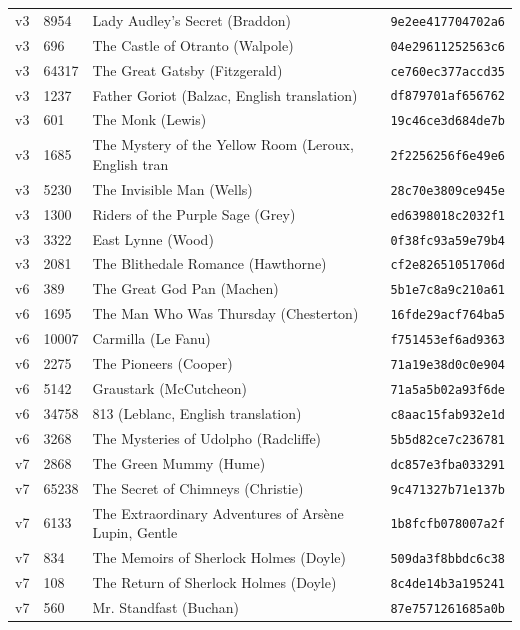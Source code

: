 \documentclass[11pt]{article}
\begin{document}
{\begin{longtable}{p{0.9cm}p{1.0cm}p{8.4cm}p{3.2cm}}
v3 & 8954 & Lady Audley's Secret (Braddon) & \texttt{9e2ee417704702a6} \\
v3 & 696 & The Castle of Otranto (Walpole) & \texttt{04e29611252563c6} \\
v3 & 64317 & The Great Gatsby (Fitzgerald) & \texttt{ce760ec377accd35} \\
v3 & 1237 & Father Goriot (Balzac, English translation) & \texttt{df879701af656762} \\
v3 & 601 & The Monk (Lewis) & \texttt{19c46ce3d684de7b} \\
v3 & 1685 & The Mystery of the Yellow Room (Leroux, English tran & \texttt{2f2256256f6e49e6} \\
v3 & 5230 & The Invisible Man (Wells) & \texttt{28c70e3809ce945e} \\
v3 & 1300 & Riders of the Purple Sage (Grey) & \texttt{ed6398018c2032f1} \\
v3 & 3322 & East Lynne (Wood) & \texttt{0f38fc93a59e79b4} \\
v3 & 2081 & The Blithedale Romance (Hawthorne) & \texttt{cf2e82651051706d} \\
v6 & 389 & The Great God Pan (Machen) & \texttt{5b1e7c8a9c210a61} \\
v6 & 1695 & The Man Who Was Thursday (Chesterton) & \texttt{16fde29acf764ba5} \\
v6 & 10007 & Carmilla (Le Fanu) & \texttt{f751453ef6ad9363} \\
v6 & 2275 & The Pioneers (Cooper) & \texttt{71a19e38d0c0e904} \\
v6 & 5142 & Graustark (McCutcheon) & \texttt{71a5a5b02a93f6de} \\
v6 & 34758 & 813 (Leblanc, English translation) & \texttt{c8aac15fab932e1d} \\
v6 & 3268 & The Mysteries of Udolpho (Radcliffe) & \texttt{5b5d82ce7c236781} \\
v7 & 2868 & The Green Mummy (Hume) & \texttt{dc857e3fba033291} \\
v7 & 65238 & The Secret of Chimneys (Christie) & \texttt{9c471327b71e137b} \\
v7 & 6133 & The Extraordinary Adventures of Arsène Lupin, Gentle & \texttt{1b8fcfb078007a2f} \\
v7 & 834 & The Memoirs of Sherlock Holmes (Doyle) & \texttt{509da3f8bbdc6c38} \\
v7 & 108 & The Return of Sherlock Holmes (Doyle) & \texttt{8c4de14b3a195241} \\
v7 & 560 & Mr. Standfast (Buchan) & \texttt{87e7571261685a0b} \\

\end{longtable}}
\end{document}
